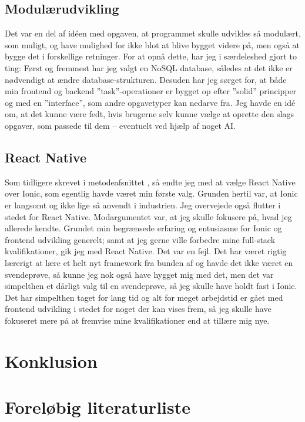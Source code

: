 \documentclass{report}
\begin{document}
\section{Modulærudvikling}
Det var en del af idéen med opgaven, at programmet skulle udvikles så modulært, som muligt, og have mulighed for ikke blot at blive bygget videre på, men også at bygge det i forskellige retninger.
For at opnå dette,  har jeg i særdeleshed gjort to ting:
Først og fremmest har jeg valgt en NoSQL database, således at det ikke er nødvendigt at ændre database-strukturen.
Desuden har jeg sørget for, at både min frontend og backend ”task”-operationer er bygget op efter ”solid” principper og med en ”interface”, som andre opgavetyper kan nedarve fra. 
Jeg havde en idé om, at det kunne være fedt, hvis brugerne selv kunne vælge at oprette den slags opgaver, som passede til dem – eventuelt ved hjælp af noget AI.

\section{React Native}
Som tidligere skrevet i metodeafsnittet , så endte jeg med at vælge React Native over Ionic, som egentlig havde været min første valg. Grunden hertil var, at Ionic er langsomt og ikke lige så anvendt i industrien. Jeg overvejede også flutter i stedet for React Native. Modargumentet var, at jeg skulle fokusere på, hvad jeg allerede kendte.
Grundet min begrænsede erfaring og entusiasme for Ionic og frontend udvikling generelt; samt at jeg gerne ville forbedre mine full-stack kvalifikationer, gik jeg med React Native. Det var en fejl.
Det har været rigtig lærerigt at lære et helt nyt framework fra bunden af og havde det ikke været en svendeprøve, så kunne jeg nok også have hygget mig med det, men det var simpelthen et dårligt valg til en svendeprøve, så jeg skulle have holdt fast i Ionic.
Det har simpelthen taget for lang tid og alt for meget arbejdstid er gået med frontend udvikling i stedet for noget der kan vises frem, så jeg skulle have fokuseret mere på at fremvise mine kvalifikationer end at tillære mig nye.

\chapter{Konklusion}

\clearpage

\appendix
\renewcommand{\thechapter}{\Alph{chapter}}

\chapter{Foreløbig literaturliste}
\end{document}

